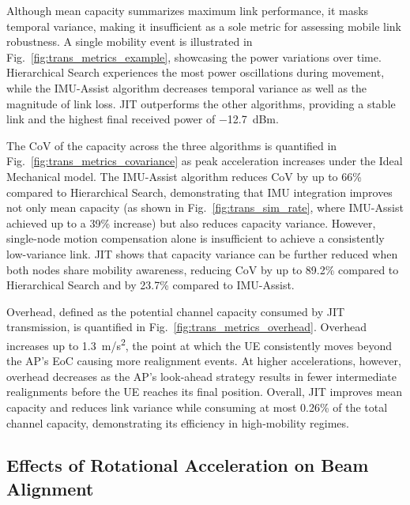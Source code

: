 \documentclass[fleqn,10pt]{wlscirep}
\begin{document}
Although mean capacity summarizes maximum link performance, it masks temporal variance, making it insufficient as a sole metric for assessing mobile link robustness. A single mobility event is illustrated in Fig.~\ref{fig:trans_metrics_example}, showcasing the power variations over time. Hierarchical Search experiences the most power oscillations during movement, while the IMU-Assist algorithm decreases temporal variance as well as the magnitude of link loss. JIT outperforms the other algorithms, providing a stable link and the highest final received power of \SI{-12.7}{dBm}.

The CoV of the capacity across the three algorithms is quantified in Fig.~\ref{fig:trans_metrics_covariance} as peak acceleration increases under the Ideal Mechanical model. The IMU-Assist algorithm reduces CoV by up to 66\% compared to Hierarchical Search, demonstrating that IMU integration improves not only mean capacity (as shown in Fig.~\ref{fig:trans_sim_rate}, where IMU-Assist achieved up to a 39\% increase) but also reduces capacity variance. However, single-node motion compensation alone is insufficient to achieve a consistently low-variance link. JIT shows that capacity variance can be further reduced when both nodes share mobility awareness, reducing CoV by up to 89.2\% compared to Hierarchical Search and by 23.7\% compared to IMU-Assist.

Overhead, defined as the potential channel capacity consumed by JIT transmission, is quantified in Fig.~\ref{fig:trans_metrics_overhead}. Overhead increases up to \SI{1.3}{m/s^2}, the point at which the UE consistently moves beyond the AP's EoC causing more realignment events. At higher accelerations, however, overhead decreases as the AP's look-ahead strategy results in fewer intermediate realignments before the UE reaches its final position. Overall, JIT improves mean capacity and reduces link variance while consuming at most 0.26\% of the total channel capacity, demonstrating its efficiency in high-mobility regimes.



\subsection*{Effects of Rotational Acceleration on Beam Alignment}
\end{document}
